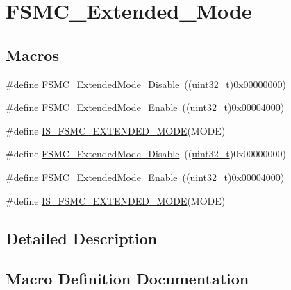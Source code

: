 \hypertarget{group___f_s_m_c___extended___mode}{}\section{F\+S\+M\+C\+\_\+\+Extended\+\_\+\+Mode}
\label{group___f_s_m_c___extended___mode}
\subsection*{Macros}
\begin{DoxyCompactItemize}
\item 
\#define \hyperlink{group___f_s_m_c___extended___mode_ga5a1f1acdc44328158f59012748980dd3}{F\+S\+M\+C\+\_\+\+Extended\+Mode\+\_\+\+Disable}~((\hyperlink{_p_e___types_8h_a33594304e786b158f3fb30289278f5af}{uint32\+\_\+t})0x00000000)
\item 
\#define \hyperlink{group___f_s_m_c___extended___mode_gaef9ff4c81a52fdb0471d2c4422271d2a}{F\+S\+M\+C\+\_\+\+Extended\+Mode\+\_\+\+Enable}~((\hyperlink{_p_e___types_8h_a33594304e786b158f3fb30289278f5af}{uint32\+\_\+t})0x00004000)
\item 
\#define \hyperlink{group___f_s_m_c___extended___mode_ga79849ea07bf2a8f09989a6babd9e66e2}{I\+S\+\_\+\+F\+S\+M\+C\+\_\+\+E\+X\+T\+E\+N\+D\+E\+D\+\_\+\+M\+O\+DE}(M\+O\+DE)
\item 
\#define \hyperlink{group___f_s_m_c___extended___mode_ga5a1f1acdc44328158f59012748980dd3}{F\+S\+M\+C\+\_\+\+Extended\+Mode\+\_\+\+Disable}~((\hyperlink{_p_e___types_8h_a33594304e786b158f3fb30289278f5af}{uint32\+\_\+t})0x00000000)
\item 
\#define \hyperlink{group___f_s_m_c___extended___mode_gaef9ff4c81a52fdb0471d2c4422271d2a}{F\+S\+M\+C\+\_\+\+Extended\+Mode\+\_\+\+Enable}~((\hyperlink{_p_e___types_8h_a33594304e786b158f3fb30289278f5af}{uint32\+\_\+t})0x00004000)
\item 
\#define \hyperlink{group___f_s_m_c___extended___mode_ga79849ea07bf2a8f09989a6babd9e66e2}{I\+S\+\_\+\+F\+S\+M\+C\+\_\+\+E\+X\+T\+E\+N\+D\+E\+D\+\_\+\+M\+O\+DE}(M\+O\+DE)
\end{DoxyCompactItemize}


\subsection{Detailed Description}


\subsection{Macro Definition Documentation}
